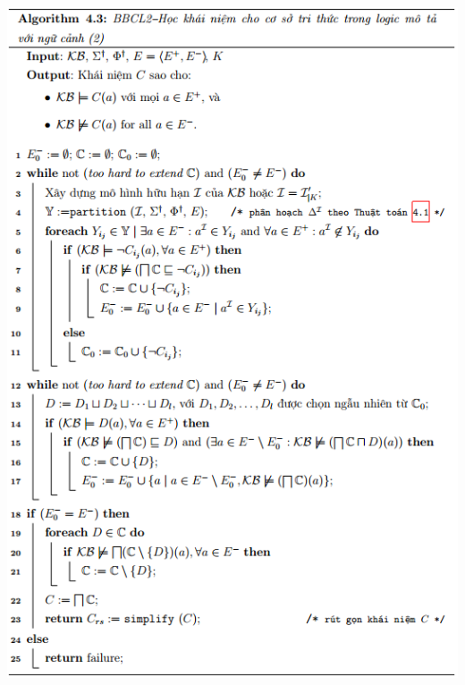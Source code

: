 \documentclass[notheorems,xcolor=dvipsnames]{beamer}
\begin{document}
\begin{frame}\frametitle{}
	\includegraphics[scale=0.44]{ThuatToan4.png}
\end{frame}
\end{document}
